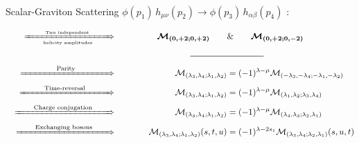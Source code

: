 \documentclass[aspectratio=169,usenames,dvipsnames]{beamer}
\begin{document}
\begin{frame}{\centering {}\\
    \small Scalar-Graviton Scattering  $\phi(p_1)\, h_{\mu\nu}(p_2)
    \rightarrow \phi(p_3)\, h_{\alpha\beta} (p_4)$ :}
\vspace{0.2mm}
\begin{tcolorbox}[enhanced,width=\textwidth,colframe=LUCopper,arc=4pt,boxrule=1pt,drop
  fuzzy shadow]
\setlength{\belowdisplayskip}{0pt}
\setlength{\abovedisplayskip}{0pt}
\begin{alignat*}{3}
 &&  \xRightarrow[\; \text{\tiny{helicity amplitudes}}  \;]{\qquad\;
    \text{\tiny{Two independent}}  \qquad\;\,}  \qquad\quad &&
  \boldsymbol{\mathcal{M}_{(0,+2;0,+2)}}  \qquad & \text{\&}  \qquad
  \boldsymbol{\mathcal{M}_{(0,+2;0,-2)}}   \\
&& && \mathclap{\rule{3cm}{0.5pt}} & \\[1mm]
&& \xRightarrow{\qquad\qquad \text{Parity} \qquad\qquad} \qquad\quad && \mathcal{M}_{(\lambda_3,\lambda_4;\lambda_1,\lambda_2)} & = (-1)^{\lambda-\mu}
  \mathcal{M}_{(-\lambda_3,-\lambda_4;-\lambda_1,-\lambda_2)}   \\
&& \xRightarrow{\qquad\;\;\;\text{Time-reversal}\;\;\;\,\qquad} \qquad\quad && \mathcal{M}_{(\lambda_3,\lambda_4;\lambda_1,\lambda_2)} & =
    (-1)^{\lambda-\mu} \mathcal{M}_{(\lambda_1,\lambda_2;\lambda_3,\lambda_4)}  \\
&&  \xRightarrow{\qquad\text{Charge conjugation}\qquad} \quad\qquad && \mathcal{M}_{(\lambda_3,\lambda_4;\lambda_1,\lambda_2)}  & =
    (-1)^{\lambda-\mu} \mathcal{M}_{(\lambda_4,\lambda_3;\lambda_2,\lambda_1)} \\
&&  \xRightarrow{\qquad\text{Exchanging bosons}\qquad} \quad\qquad &&
\mathcal{M}_{(\lambda_3,\lambda_4;\lambda_1,\lambda_2)} (s,t,u) & =
(-1)^{\lambda-2s_1} \mathcal{M}_{(\lambda_3,\lambda_4;\lambda_2,\lambda_1)} (s,u,t)
\end{alignat*}  

\end{tcolorbox}
\end{frame}
\end{document}
